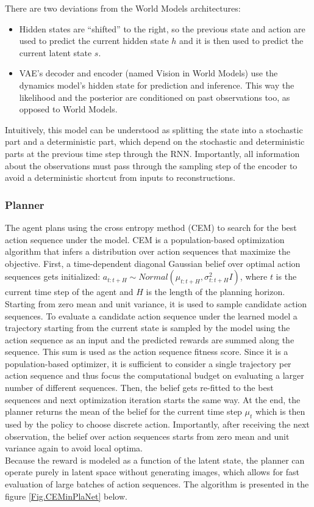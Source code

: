 \noindent There are two deviations from the World Models architectures:
\begin{itemize}
\item Hidden states are ``shifted'' to the right, so the previous state and action are used to predict the current hidden state $h$ and it is then used to predict the current latent state $s$.
\item VAE's decoder and encoder (named Vision in World Models) use the dynamics model's hidden state for prediction and inference. This way the likelihood and the posterior are conditioned on past observations too, as opposed to World Models.
\end{itemize}

Intuitively, this model can be understood as splitting the state into a stochastic part and a deterministic part, which depend on the stochastic and deterministic parts at the previous time step through the RNN. Importantly, all information about the observations must pass through the sampling step of the encoder to avoid a deterministic shortcut from inputs to reconstructions.

\subsubsection{Planner}

The agent plans using the cross entropy method (CEM) \cite{Algo.CEM} to search for the best action sequence under the model. CEM is a population-based optimization algorithm that infers a distribution over action sequences that maximize the objective.
First, a time-dependent diagonal Gaussian belief over optimal action sequences gets initialized: $a_{t:t+H} \sim Normal(\mu_{t:t+H}, \sigma^2_{t:t+H}I)$, where $t$ is the current time step of the agent and $H$ is the length of the planning horizon. Starting from zero mean and unit variance, it is used to sample candidate action sequences. To evaluate a candidate action sequence under the learned model a trajectory starting from the current state is sampled by the model using the action sequence as an input and the predicted rewards are summed along the sequence. This sum is used as the action sequence fitness score. Since it is a population-based optimizer, it is sufficient to consider a single trajectory per action sequence and thus focus the computational budget on evaluating a larger number of different sequences. Then, the belief gets re-fitted to the best sequences and next optimization iteration starts the same way. At the end, the planner returns the mean of the belief for the current time step $\mu_t$ which is then used by the policy to choose discrete action. Importantly, after receiving the next observation, the belief over action sequences starts from zero mean and unit variance again to avoid local optima. \\
Because the reward is modeled as a function of the latent state, the planner can operate purely in latent space without generating images, which allows for fast evaluation of large batches of action sequences. The algorithm is presented in the figure \ref{Fig.CEMinPlaNet} below.

